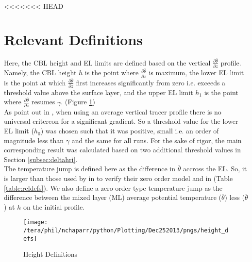 <<<<<<< HEAD
\clearpage

\section{Relevant Definitions}
\FloatBarrier

Here, the \acs{CBL} height and \acs{EL} limits are defined based on the vertical  $\frac{\partial \overline{\theta}}{\partial z}$
profile.  Namely, the \acs{CBL} height $h$ is the point where  $\frac{\partial \overline{\theta}}{\partial z}$ is maximum, the 
lower \acs{EL} limit is the point at which  $\frac{\partial \overline{\theta}}{\partial z}$ first increases
significantly from zero i.e. exceeds a threshold value above the surface layer, and the upper \acs{EL} limit $h_{1}$ is the point where
$\frac{\partial \overline{\theta}}{\partial z}$ resumes $\gamma$. (Figure \ref{fig:hdefs})\\

As \citeauthor{BrooksFowler2} point out in \cite{BrooksFowler2}, when using an average vertical 
tracer profile there is no universal critereon for a significant gradient.  So a threshold value for the
lower \acs{EL} limit ($h_{0}$) was chosen such that it was positive, small i.e. an order of magnitude 
less than $\gamma$ and the same for all runs.  For the sake of rigor, the main corresponding result 
was calculated based on two additional threshold values in Section \ref{subsec:deltahri}.\\

The temperature jump is defined here as the difference in $\overline{\theta}$ accross the \acs{EL}.
So, it is larger than those used by  \citeauthor{FedConzMir04} in \cite{FedConzMir04} to verify 
their zero order model and \citeauthor{SullMoengStev} in \cite{SullMoengStev} (Table \ref{table:reldefs}).
We also define a zero-order type temperature jump as the difference between the mixed layer (\acs{ML}) 
average potential temperature ($\overline{\theta}$) less ($\overline{\theta}$) at $h$ on the initial profile.
\\ 
 
\begin{figure}[htbp]
    \centering
    \texttt{[image: /tera/phil/nchaparr/python/Plotting/Dec252013/pngs/height\_defs]}
    \caption{Height Definitions}
    \label{fig:hdefs}   %
\end{figure}

